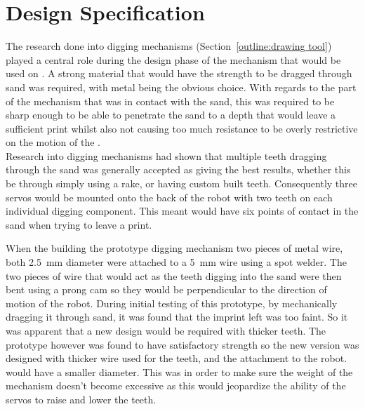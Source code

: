 
\chapter{Design Specification}\label{design specification}\label{section \thechapter}



        The research done into digging mechanisms (Section~\ref{outline:drawing tool}) played a central role during the design phase of the mechanism that would be used on \SandE. A strong material that would have the strength to be dragged through sand was required, with metal being the obvious choice. With regards to the part of the mechanism that was in contact with the sand, this was required to be sharp enough to be able to penetrate the sand to a depth that would leave a sufficient print whilst also not causing too much resistance to be overly restrictive on the motion of the \SandE.\\
        Research into digging mechanisms had shown that multiple teeth dragging through the sand was generally accepted as giving the best results, whether this be through simply using a rake, or having custom built teeth. Consequently three servos would be mounted onto the back of the robot with two teeth on each individual digging component. This meant \SandE would have six points of contact in the sand when trying to leave a print.

        When the building the prototype digging mechanism two pieces of metal wire, both \SI{2.5}{mm} diameter were attached to a \SI{5}{mm} wire using a spot welder. The two pieces of wire that would act as the teeth digging into the sand were then bent using a prong cam so they would be perpendicular to the direction of motion of the robot. During initial testing of this prototype, by mechanically dragging it through sand, it was found that the imprint left was too faint. So it was apparent that a new design would be required with thicker teeth. The prototype however was found to have satisfactory strength so the new version was designed with thicker wire used for the teeth, and the attachment to the robot. would have a smaller diameter. This was in order to make sure the weight of the mechanism doesn't become excessive as this would jeopardize the ability of the servos to raise and lower the teeth.

